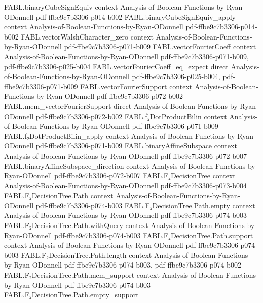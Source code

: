\begin{theorem}
\proofstep
  {FABL.binaryCubeSignEquiv}
  {context}
  {Analysis-of-Boolean-Functions-by-Ryan-ODonnell}
  {pdf-ffbe9c7b3306-p014-b002}
\proofstep
  {FABL.binaryCubeSignEquiv_apply}
  {context}
  {Analysis-of-Boolean-Functions-by-Ryan-ODonnell}
  {pdf-ffbe9c7b3306-p014-b002}
\proofstep
  {FABL.vectorWalshCharacter_zero}
  {context}
  {Analysis-of-Boolean-Functions-by-Ryan-ODonnell}
  {pdf-ffbe9c7b3306-p071-b009}
\proofstep
  {FABL.vectorFourierCoeff}
  {context}
  {Analysis-of-Boolean-Functions-by-Ryan-ODonnell}
  {pdf-ffbe9c7b3306-p071-b009,
    pdf-ffbe9c7b3306-p025-b004}
\proofstep
  {FABL.vectorFourierCoeff_eq_expect}
  {direct}
  {Analysis-of-Boolean-Functions-by-Ryan-ODonnell}
  {pdf-ffbe9c7b3306-p025-b004,
    pdf-ffbe9c7b3306-p071-b009}
\proofstep
  {FABL.vectorFourierSupport}
  {context}
  {Analysis-of-Boolean-Functions-by-Ryan-ODonnell}
  {pdf-ffbe9c7b3306-p072-b002}
\proofstep
  {FABL.mem_vectorFourierSupport}
  {direct}
  {Analysis-of-Boolean-Functions-by-Ryan-ODonnell}
  {pdf-ffbe9c7b3306-p072-b002}
\proofstep
  {FABL.f₂DotProductBilin}
  {context}
  {Analysis-of-Boolean-Functions-by-Ryan-ODonnell}
  {pdf-ffbe9c7b3306-p071-b009}
\proofstep
  {FABL.f₂DotProductBilin_apply}
  {context}
  {Analysis-of-Boolean-Functions-by-Ryan-ODonnell}
  {pdf-ffbe9c7b3306-p071-b009}
\proofstep
  {FABL.binaryAffineSubspace}
  {context}
  {Analysis-of-Boolean-Functions-by-Ryan-ODonnell}
  {pdf-ffbe9c7b3306-p072-b007}
\proofstep
  {FABL.binaryAffineSubspace_direction}
  {context}
  {Analysis-of-Boolean-Functions-by-Ryan-ODonnell}
  {pdf-ffbe9c7b3306-p072-b007}
\proofstep
  {FABL.F₂DecisionTree}
  {context}
  {Analysis-of-Boolean-Functions-by-Ryan-ODonnell}
  {pdf-ffbe9c7b3306-p073-b004}
\proofstep
  {FABL.F₂DecisionTree.Path}
  {context}
  {Analysis-of-Boolean-Functions-by-Ryan-ODonnell}
  {pdf-ffbe9c7b3306-p074-b003}
\proofstep
  {FABL.F₂DecisionTree.Path.empty}
  {context}
  {Analysis-of-Boolean-Functions-by-Ryan-ODonnell}
  {pdf-ffbe9c7b3306-p074-b003}
\proofstep
  {FABL.F₂DecisionTree.Path.withQuery}
  {context}
  {Analysis-of-Boolean-Functions-by-Ryan-ODonnell}
  {pdf-ffbe9c7b3306-p074-b003}
\proofstep
  {FABL.F₂DecisionTree.Path.support}
  {context}
  {Analysis-of-Boolean-Functions-by-Ryan-ODonnell}
  {pdf-ffbe9c7b3306-p074-b003}
\proofstep
  {FABL.F₂DecisionTree.Path.length}
  {context}
  {Analysis-of-Boolean-Functions-by-Ryan-ODonnell}
  {pdf-ffbe9c7b3306-p074-b003,
    pdf-ffbe9c7b3306-p074-b002}
\proofstep
  {FABL.F₂DecisionTree.Path.mem_support}
  {context}
  {Analysis-of-Boolean-Functions-by-Ryan-ODonnell}
  {pdf-ffbe9c7b3306-p074-b003}
\proofstep
  {FABL.F₂DecisionTree.Path.empty_support}

\end{theorem}
